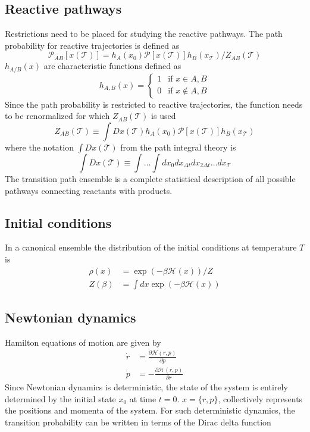 \documentclass{article}
\begin{document}
\subsection{Reactive pathways}
Restrictions need to be placed for studying the reactive pathways. The path probability for 
reactive trajectories is defined as
\begin{equation}
\mathcal{P}_{AB}[x(\mathcal{T})]= h_A(x_0)\mathcal{P}[x(\mathcal{T})]h_B(x_{\mathcal{T}})/Z_{AB}(\mathcal{T})
\end{equation}
$h_{A/B}(x)$ are characteristic functions defined as
\[
 h_{A,B}(x) = 
  \begin{cases} 
   1 & \text{if } x \in A,B \\
   0 & \text{if } x \not\in A,B
  \end{cases}
\]
Since the path probability is restricted to reactive trajectories, the 
function needs to be renormalized for which $Z_{AB}(\mathcal{T})$ is used
\begin{equation}
Z_{AB}(\mathcal{T}) \equiv \int Dx(\mathcal{T})h_A(x_0)\mathcal{P}[x(\mathcal{T})]
h_B(x_{\mathcal{T}})
\end{equation}
where the notation $\int Dx(\mathcal{T})$ from the path integral theory is 
\begin{equation}
\int Dx(\mathcal{T}) \equiv \int\ldots\int dx_0dx_{\Delta t}dx_{2\Delta t}\ldots dx_{\mathcal{T}}
\end{equation}
The transition path ensemble is a complete statistical description of all possible pathways connecting reactants with products. 
\subsection{Initial conditions}
In a canonical ensemble the distribution of the initial conditions
at temperature $T$ is 
\begin{align}
\rho(x) &= \exp(-\beta\mathcal{H}(x))/Z \\
Z(\beta) &= \int dx\exp(-\beta\mathcal{H}(x))
\end{align} 
\subsection{Newtonian dynamics}
Hamilton equations of motion are given by
\begin{align}
\dot{r} &=\frac{\partial \mathcal{H}(r,p)}{\partial p} \\
\dot{p} &=-\frac{\partial\mathcal{H}(r,p)}{\partial r}
\end{align}
Since Newtonian dynamics is deterministic, the state of the system is entirely
determined by the initial state $x_0$ at time $t=0$. 
$x=\{r,p\}$, collectively represents the positions and momenta of the system. 
For such deterministic dynamics, the transition probability can be written in terms of the Dirac delta function
\end{document}

